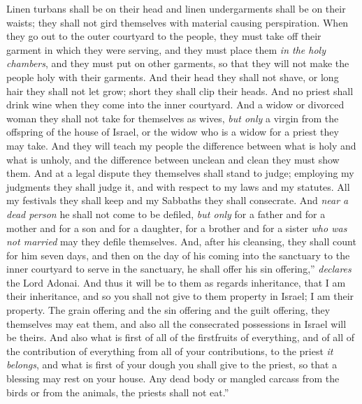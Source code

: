 \begin{biblechapter}
\verse Linen turbans shall be on their head and linen undergarments shall be on their waists; they shall not gird themselves with material causing perspiration.
\verse When they go out to the outer courtyard to the people, they must take off their garment in which they were serving, and they must place them \textit{in the holy chambers}, and they must put on other garments, so that they will not make the people holy with their garments.
\verse And their head they shall not shave, or long hair they shall not let grow; short they shall clip their heads.
\verse And no priest shall drink wine when they come into the inner courtyard.
\verse And a widow or divorced woman they shall not take for themselves as wives, \textit{but only} a virgin from the offspring of the house of Israel, or the widow who is a widow for a priest they may take.
\verse And they will teach my people the difference between what is holy and what is unholy, and the difference between unclean and clean they must show them.
\verse And at a legal dispute they themselves shall stand to judge; employing my judgments they shall judge it, and with respect to my laws and my statutes. All my festivals they shall keep and my Sabbaths they shall consecrate.
\verse And \textit{near a dead person} he shall not come to be defiled, \textit{but only} for a father and for a mother and for a son and for a daughter, for a brother and for a sister \textit{who was not married} may they defile themselves.
\verse And, after his cleansing, they shall count for him seven days,
\verse and then on the day of his coming into the sanctuary to the inner courtyard to serve in the sanctuary, he shall offer his sin offering,” \textit{declares} the Lord Adonai.
\verse And thus it will be to them as regards inheritance, that I am their inheritance, and so you shall not give to them property in Israel; I am their property.
\verse The grain offering and the sin offering and the guilt offering, they themselves may eat them, and also all the consecrated possessions in Israel will be theirs.
\verse And also what is first of all of the firstfruits of everything, and of all of the contribution of everything from all of your contributions, to the priest \textit{it belongs}, and what is first of your dough you shall give to the priest, so that a blessing may rest on your house.
\verse Any dead body or mangled carcass from the birds or from the animals, the priests shall not eat.”
\end{biblechapter}

